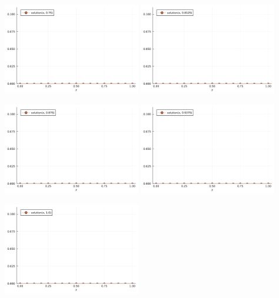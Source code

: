 \documentclass[a4paper]{article}
\begin{document}
\includegraphics[width=0.45\textwidth]{images/result-12}
\includegraphics[width=0.45\textwidth]{images/result-13}

\includegraphics[width=0.45\textwidth]{images/result-14}
\includegraphics[width=0.45\textwidth]{images/result-15}

\includegraphics[width=0.45\textwidth]{images/result-16}
\end{document}
